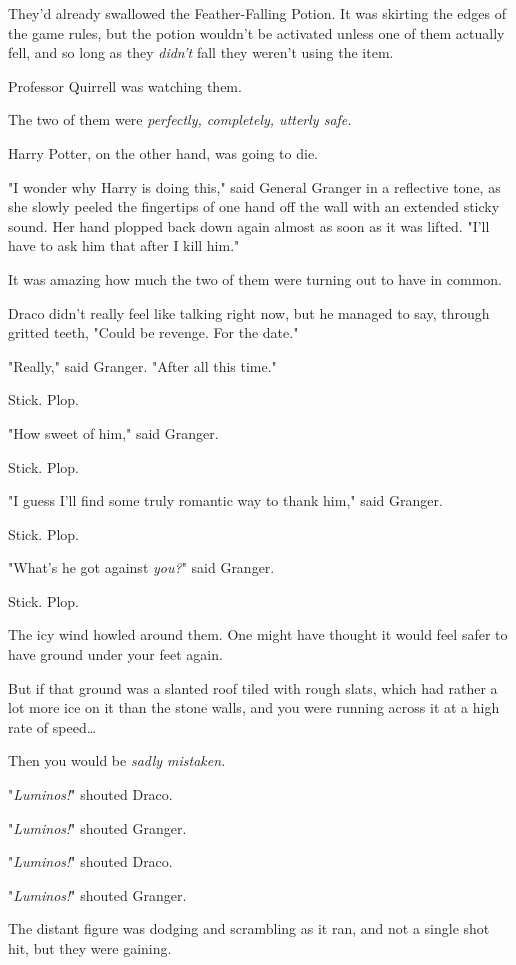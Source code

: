 They'd already swallowed the Feather-Falling Potion. It was skirting the edges 
of the game rules, but the potion wouldn't be activated unless one of them 
actually fell, and so long as they \emph{didn't} fall they weren't using the 
item.

Professor Quirrell was watching them.

The two of them were \emph{perfectly, completely, utterly safe.}

Harry Potter, on the other hand, was going to die.

"I wonder why Harry is doing this," said General Granger in a reflective tone, 
as she slowly peeled the fingertips of one hand off the wall with an extended 
sticky sound. Her hand plopped back down again almost as soon as it was lifted. 
"I'll have to ask him that after I kill him."

It was amazing how much the two of them were turning out to have in common.

Draco didn't really feel like talking right now, but he managed to say, through 
gritted teeth, "Could be revenge. For the date."

"Really," said Granger. "After all this time."

Stick. Plop.

"How sweet of him," said Granger.

Stick. Plop.

"I guess I'll find some truly romantic way to thank him," said Granger.

Stick. Plop.

"What's he got against \emph{you?}" said Granger.

Stick. Plop.

The icy wind howled around them.
\sbreak
One might have thought it would feel safer to have ground under your feet again.

But if that ground was a slanted roof tiled with rough slats, which had rather 
a lot more ice on it than the stone walls, and you were running across it at a 
high rate of speed{\ldots}

Then you would be \emph{sadly mistaken.}

"\emph{Luminos!}" shouted Draco.

"\emph{Luminos!}" shouted Granger.

"\emph{Luminos!}" shouted Draco.

"\emph{Luminos!}" shouted Granger.

The distant figure was dodging and scrambling as it ran, and not a single shot 
hit, but they were gaining.

